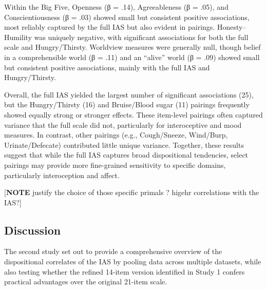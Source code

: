 \documentclass[
  jou,
  floatsintext,
  longtable,
  nolmodern,
  notxfonts,
  notimes,
  colorlinks=true,linkcolor=blue,citecolor=blue,urlcolor=blue]{apa7}
\begin{document}
Within the Big Five, Openness (β = .14), Agreeableness (β = .05), and
Conscientiousness (β = .03) showed small but consistent positive
associations, most reliably captured by the full IAS but also evident in
pairings. Honesty--Humility was uniquely negative, with significant
associations for both the full scale and Hungry/Thirsty. Worldview
measures were generally null, though belief in a comprehensible world (β
= .11) and an ``alive'' world (β = .09) showed small but consistent
positive associations, mainly with the full IAS and Hungry/Thirsty.

Overall, the full IAS yielded the largest number of significant
associations (25), but the Hungry/Thirsty (16) and Bruise/Blood sugar
(11) pairings frequently showed equally strong or stronger effects.
These item-level pairings often captured variance that the full scale
did not, particularly for interoceptive and mood measures. In contrast,
other pairings (e.g., Cough/Sneeze, Wind/Burp, Urinate/Defecate)
contributed little unique variance. Together, these results suggest that
while the full IAS captures broad dispositional tendencies, select
pairings may provide more fine-grained sensitivity to specific domains,
particularly interoception and affect.

{[}\textbf{NOTE} justify the choice of those specific primals ? higehr
correlations with the IAS?{]}

\subsection{Discussion}\label{discussion-1}

The second study set out to provide a comprehensive overview of the
dispositional correlates of the IAS by pooling data across multiple
datasets, while also testing whether the refined 14-item version
identified in Study 1 confers practical advantages over the original
21-item scale.
\end{document}
